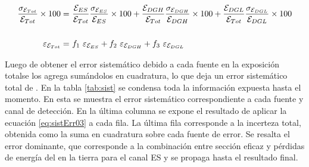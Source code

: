 	\begin{equation}
	\begin{aligned}
	\frac{\sigma_{{\cal E}_{Tot}}}{{\cal E}_{Tot}}\times 100 
	=&\ \frac{{\cal E}_{ES}}{{\cal E}_{Tot}} \frac{\sigma_{{\cal E}_{ES}}}{{\cal E}_{ES}} \times 100
	+ \frac{{\cal E}_{DGH}}{{\cal E}_{Tot}} \frac{\sigma_{{\cal E}_{DGH}}}{{\cal E}_{DGH}}\times 100
	+ \frac{{\cal E}_{DGL}}{{\cal E}_{Tot}} \frac{\sigma_{{\cal E}_{DGL}}}{{\cal E}_{DGL}}\times 100\\
	& \\
	\varepsilon_{{\cal E}_{Tot}}
	=&\ f_1\ \varepsilon_{{\cal E}_{ES}}
	+   f_2\ \varepsilon_{{\cal E}_{DGH}}
	+   f_3\ \varepsilon_{{\cal E}_{DGL}}
	\end{aligned}
	\label{eq:sistErr03}
	\end{equation}
	
	Luego de obtener el error sistemático debido a cada fuente en la exposición totalse los agrega sumándolos en cuadratura, lo que deja un error sistem\'atico total de .
	En la tabla \ref{tab:sist} se condensa toda la información expuesta hasta el momento.
	En esta se muestra el error sistemático correspondiente a cada fuente y canal de detección.
	En la última columna se expone el resultado de aplicar la ecuación \ref{eq:sistErr03} a cada fila.
	La \'ultima fila corresponde a la incerteza total, obtenida como la suma en cuadratura sobre cada fuente de error.
	Se resalta el error dominante, que corresponde a la combinación entre sección eficaz y pérdidas de energía del \tauon{} en la tierra para el canal ES y se propaga hasta el resultado final.
	
